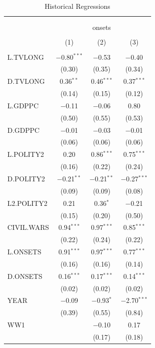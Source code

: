 \documentclass[11pt,article,oneside]{memoir}
\begin{document}
\begin{table}[!htbp] \centering 
  \caption{Historical Regressions} 
  \label{} 
\footnotesize 
\begin{tabular}{@{\extracolsep{5pt}}lccc} 
\\[-1.8ex]\hline \\[-1.8ex] 
\\[-1.8ex] & \multicolumn{3}{c}{onsets} \\ 
\\[-1.8ex] & (1) & (2) & (3)\\ 
\hline \\[-1.8ex] 
 L.TVLONG & $-$0.80$^{***}$ & $-$0.53 & $-$0.40 \\ 
  & (0.30) & (0.35) & (0.34) \\ 
  D.TVLONG & 0.36$^{**}$ & 0.46$^{***}$ & 0.37$^{***}$ \\ 
  & (0.14) & (0.15) & (0.12) \\ 
  L.GDPPC & $-$0.11 & $-$0.06 & 0.80 \\ 
  & (0.50) & (0.55) & (0.53) \\ 
  D.GDPPC & $-$0.01 & $-$0.03 & $-$0.01 \\ 
  & (0.06) & (0.06) & (0.06) \\ 
  L.POLITY2 & 0.20 & 0.86$^{***}$ & 0.75$^{***}$ \\ 
  & (0.16) & (0.22) & (0.24) \\ 
  D.POLITY2 & $-$0.21$^{**}$ & $-$0.21$^{**}$ & $-$0.27$^{***}$ \\ 
  & (0.09) & (0.09) & (0.08) \\ 
  L2.POLITY2 & 0.21 & 0.36$^{*}$ & $-$0.21 \\ 
  & (0.15) & (0.20) & (0.50) \\ 
  CIVIL.WARS & 0.94$^{***}$ & 0.97$^{***}$ & 0.85$^{***}$ \\ 
  & (0.22) & (0.24) & (0.22) \\ 
  L.ONSETS & 0.91$^{***}$ & 0.97$^{***}$ & 0.77$^{***}$ \\ 
  & (0.16) & (0.16) & (0.14) \\ 
  D.ONSETS & 0.16$^{***}$ & 0.17$^{***}$ & 0.14$^{***}$ \\ 
  & (0.02) & (0.02) & (0.02) \\ 
  YEAR & $-$0.09 & $-$0.93$^{*}$ & $-$2.70$^{***}$ \\ 
  & (0.39) & (0.55) & (0.84) \\ 
  WW1 &  & $-$0.10 & 0.17 \\ 
  &  & (0.17) & (0.18) \\ 

\end{tabular}
\end{table}
\end{document}
